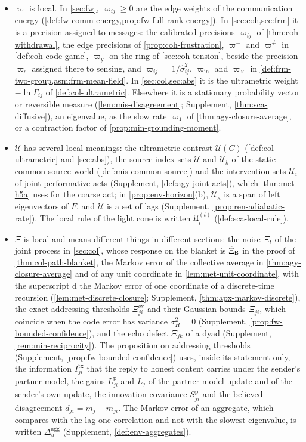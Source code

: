 \begin{itemize}
\item $\varpi$ is local. In \cref{sec:fw}, $\varpi_{ij}\ge0$ are the edge weights of the communication energy (\cref{def:fw-comm-energy,prop:fw-full-rank-energy}). In \cref{sec:coh,sec:frm} it is a precision assigned to messages: the calibrated precisions $\varpi_{ij}$ of \cref{thm:coh-withdrawal}, the edge precisions of \cref{prop:coh-frustration}, $\varpi^{=}$ and $\varpi^{\neq}$ in \cref{def:coh-code-game}, $\varpi_{\mathrm y}$ on the ring of \cref{sec:coh-tension}, beside the precision $\varpi_{\mathrm s}$ assigned there to sensing, and $\varpi_{ij}=1/\hat\sigma^2_{ij}$, $\varpi_{\mathrm{in}}$ and $\varpi_\times$ in \cref{def:frm-two-group,asm:frm-mean-field}. In \cref{sec:col,sec:abs} it is the ultrametric weight $-\ln\Gamma_{ij}$ of \cref{def:col-ultrametric}. Elsewhere it is a stationary probability vector or reversible measure (\cref{lem:mis-disagreement}; Supplement, \cref{thm:sca-diffusive}), an eigenvalue, as the slow rate $\varpi_1$ of \cref{thm:agy-closure-average}, or a contraction factor of \cref{prop:min-grounding-moment}.
\item $\mathcal U$ has several local meanings: the ultrametric contrast $\mathcal U(C)$ (\cref{def:col-ultrametric} and \cref{sec:abs}), the source index sets $\mathcal U$ and $\mathcal U_k$ of the static common-source world (\cref{def:mis-common-source}) and the intervention sets $\mathcal U_i$ of joint performative acts (Supplement, \cref{def:agy-joint-acts}), which \cref{thm:met-h5a} uses for the coarse act; in \cref{prop:env-horizon}(b), $\mathcal U_\kappa$ is a span of left eigenvectors of $F$, and $\mathcal U$ is a set of lags (Supplement, \cref{prop:ren-adiabatic-rate}). The local rule of the light cone is written $\mathfrak U^{(t)}_i$ (\cref{def:sca-local-rule}).
\item $\Xi$ is local and means different things in different sections: the noise $\Xi_t$ of the joint process in \cref{sec:col}, whose response on the blanket is $\tilde\Xi_{\mathsf{B}}$ in the proof of \cref{thm:col-path-blanket}, the Markov error of the collective average in \cref{thm:agy-closure-average} and of any unit coordinate in \cref{lem:met-unit-coordinate}, with the superscript $\mathrm d$ the Markov error of one coordinate of a discrete-time recursion (\cref{lem:met-discrete-closure}; Supplement, \cref{thm:apx-markov-discrete}), the exact addressing thresholds $\Xi^{\mathrm{ex}}_{ji}$ and their Gaussian bounds $\Xi_{ji}$, which coincide when the code error has variance $\sigma_H^2=0$ (Supplement, \cref{prop:fw-bounded-confidence}), and the echo defect $\Xi_{jk}$ of a dyad (Supplement, \cref{rem:min-reciprocity}). The proposition on addressing thresholds (Supplement, \cref{prop:fw-bounded-confidence}) uses, inside its statement only, the information $I^{\mathrm{tx}}_{ji}$ that the reply to honest content carries under the sender's partner model, the gains $L^{\mathrm p}_{ji}$ and $L_j$ of the partner-model update and of the sender's own update, the innovation covariance $S^{\mathrm p}_{ji}$ and the believed disagreement $d_{ji}=m_j-\bar m_{ji}$. The Markov error of an aggregate, which compares with the lag-one correlation and not with the slowest eigenvalue, is written $\Delta^{\mathrm{agg}}_u$ (Supplement, \cref{def:env-aggregates}).

\end{itemize}
